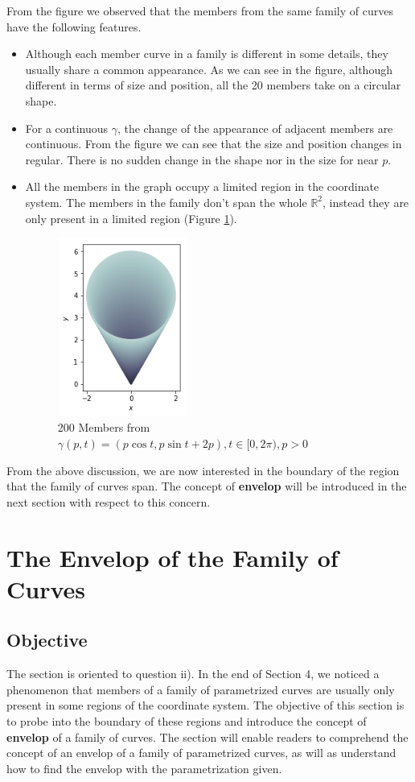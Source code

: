 \documentclass[a4paper]{article}
\begin{document}
From the figure we observed that the members from the same family of curves have the following features.
\begin{itemize}
\item Although each member curve in a family is different in some details, they usually share a common appearance. As we can see in the figure, although different in terms of size and position, all the 20 members take on a circular shape.
\item For a continuous $\gamma$, the change of the appearance of adjacent members are continuous. From the figure we can see that the size and position changes in regular. There is no sudden change in the shape nor in the size for near $p$.
\item All the members in the graph occupy a limited region in the coordinate system. The members in the family don't span the whole $\mathbb{R}^2$, instead they are only present in a limited region (Figure \ref{fig:family_200}). 

\begin{figure}[!htbp]
	\centering
	\includegraphics[width=0.4\textwidth]{family_200.png}
	\caption{200 Members from $\gamma(p,t) = (p \cos t, p\sin t + 2p), t \in [0,2\pi), p>0$}
	\label{fig:family_200}
\end{figure}
\end{itemize}

From the above discussion, we are now interested in the boundary of the region that the family of curves span. The concept of \textbf{envelop} will be introduced in the next section with respect to this concern.
\section{The Envelop of the Family of Curves}
\subsection{Objective}
The section is oriented to question ii). In the end of Section 4, we noticed a phenomenon that members of a family of parametrized curves are usually only present in some regions of the coordinate system. The objective of this section is to probe into the boundary of these regions and introduce the concept of \textbf{envelop} of a family of curves. The section will enable readers to comprehend the concept of an envelop of a family of parametrized curves, as will as understand how to find the envelop with the parametrization given. 
\end{document}
